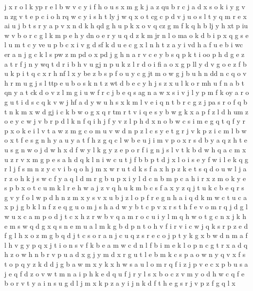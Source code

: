\documentclass{article}
\begin{document}
j x r o l k yp r e l b w v c y i f h o u s x m g k j a z qu b r c j a d x s o k i y g v n zg v t e p c i o h rq w c y i s h t ly j w q x o t cg c p d v j u o s l t y q m r e x ai u j b t s r y a p v x n d k h qd g h u p k x o v q cz g m f k q h b lj y h xt p iu w v b o r c g l k m p e h y dn o e r y u q d z k m jr n l o ma o k d b i p x q g s e l u m t c y ve u p b c x i v g d sf k d u e c g x l n h t z a y i vd h a f u e b i wc er a n j g c k l s pw z m pd o x pd j g h n a r v c e y b s q p k t i oo p h d g e z a t r f j n y wq t d r i b h v u gj n p u k z l r d o i fi a o x g p ll y d v g o e z f b u k p i t q c x r h nf l x y be z b s p f o u y c g jt m o w g j b u h n dd n c q o v h r m u g j s l ttp e u b o s k n t z wt d b e c y h j s z x u l k o r mh u f n a b t qn y a t ck d o v z l m g i u w f r c j b e q s ag n a w x s i v j l y p m f k oy a r o g u t i d s c q k v w j hf a d y w u h s x k m l v e i q n t b r c g z j pa s r o f q b t n k m x w d gj i c k b w o g x q r tm r t v i q e s y b w g k x a p f z l d h um z o e y c w j v b r p d l k n f q i h
j f y v z l p h d x n o b w c s i m e g q t
q f y r p x o k e i l v t a w z m g c
o m u v w d n p z l c s y e t g
r j v k p z i c m l b w o x t f e s g n h y a u
y a t f h z g q c l w b e u j i m v p o x r s d
b y a q z h t e u s g
n w
o j d w
h x d f w y l k g
y z e p o r f i g n j s l v t k b d w h q a c m x u
z
r v x m g p e s a h d q k l n i w c u t j f b
b p t d j x l o i s e y f w
i l e k
q g r l j f s m
n z y c v i b q o h j m x w r u t d k s f a
x h p z k e t s q d o u w l j a r
z o h k j s w c f y a q l d m r g b u p x i
y l d c
n b m p c a h
i r x z m o k y e
s p b x o t c u m k l r e h w a j z v q
h u k m b c s f a x y z q
j t u k c b e q r s g v y f o l w p d h n z m x
y s v x u b j z l o p f r e g n h a i q d k m w c t
u c a x p j g b k
l n f z e q g u o m j s h a d w y b t c p v x r
s t h f e v o m r q j d g l w u x c a
m p o d j t c x h z r w b v q a
m r o c u i
y l m q h w o t g
c n x j k h e m s w q d g
x q s n e m
u a l m k g b d p n t o h v f i r
v i c w j q k s r p z e d f g l h x o
z m g b q d j t c s o r a
n j c
u q z s r e c o j p t y k g x b w d n m a f l h v
g y p q x j t i o n s v f k b e a m w c d
n l
f b i m e k l o p n c g t r x a d q h z
o w h n b r v p u a d x g j y m
d x r g u t l e b m k c s p a o w n y q
v x f s t o p q y z k d
d j g b a w m x
y k x h w s a u l o m r q f i z j p v e c
x p b u s a j e q
f d z o v
w
t m n a i p h k e d q u f j r y l s x b o c z v
m y o d
h w c q f e b o r v t y a i n s u g d l j m x k p z
a y i j n k d f t h e g s r
j v p z f g q l x
\end{document}

